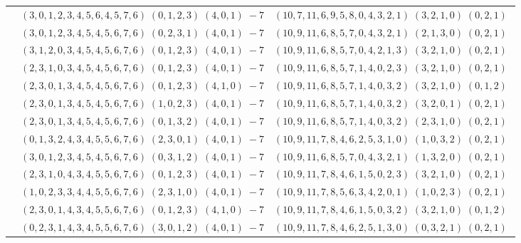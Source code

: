 \documentclass[11pt]{article}
\begin{document}
\begin{longtable}[l]{|c|c|c|}
 \cline{2-3} 
 & $(3 ,0 ,1 ,2 ,3 ,4 ,5 ,6 ,4 ,5 ,7 ,6) \;(0 ,1 ,2 ,3) \;(4 ,0 ,1) \;-7$ & $(10 ,7 ,11 ,6 ,9 ,5 ,8 ,0 ,4 ,3 ,2 ,1) \;(3 ,2 ,1 ,0) \;(0 ,2 ,1) \;$\\ 
 \cline{2-3} 
 & $(3 ,0 ,1 ,2 ,3 ,4 ,5 ,4 ,5 ,6 ,7 ,6) \;(0 ,2 ,3 ,1) \;(4 ,0 ,1) \;-7$ & $(10 ,9 ,11 ,6 ,8 ,5 ,7 ,0 ,4 ,3 ,2 ,1) \;(2 ,1 ,3 ,0) \;(0 ,2 ,1) \;$\\ 
 \cline{2-3} 
 & $(3 ,1 ,2 ,0 ,3 ,4 ,5 ,4 ,5 ,6 ,7 ,6) \;(0 ,1 ,2 ,3) \;(4 ,0 ,1) \;-7$ & $(10 ,9 ,11 ,6 ,8 ,5 ,7 ,0 ,4 ,2 ,1 ,3) \;(3 ,2 ,1 ,0) \;(0 ,2 ,1) \;$\\ 
 \cline{2-3} 
 & $(2 ,3 ,1 ,0 ,3 ,4 ,5 ,4 ,5 ,6 ,7 ,6) \;(0 ,1 ,2 ,3) \;(4 ,0 ,1) \;-7$ & $(10 ,9 ,11 ,6 ,8 ,5 ,7 ,1 ,4 ,0 ,2 ,3) \;(3 ,2 ,1 ,0) \;(0 ,2 ,1) \;$\\ 
 \cline{2-3} 
 & $(2 ,3 ,0 ,1 ,3 ,4 ,5 ,4 ,5 ,6 ,7 ,6) \;(0 ,1 ,2 ,3) \;(4 ,1 ,0) \;-7$ & $(10 ,9 ,11 ,6 ,8 ,5 ,7 ,1 ,4 ,0 ,3 ,2) \;(3 ,2 ,1 ,0) \;(0 ,1 ,2) \;$\\ 
 \cline{2-3} 
 & $(2 ,3 ,0 ,1 ,3 ,4 ,5 ,4 ,5 ,6 ,7 ,6) \;(1 ,0 ,2 ,3) \;(4 ,0 ,1) \;-7$ & $(10 ,9 ,11 ,6 ,8 ,5 ,7 ,1 ,4 ,0 ,3 ,2) \;(3 ,2 ,0 ,1) \;(0 ,2 ,1) \;$\\ 
 \cline{2-3} 
 & $(2 ,3 ,0 ,1 ,3 ,4 ,5 ,4 ,5 ,6 ,7 ,6) \;(0 ,1 ,3 ,2) \;(4 ,0 ,1) \;-7$ & $(10 ,9 ,11 ,6 ,8 ,5 ,7 ,1 ,4 ,0 ,3 ,2) \;(2 ,3 ,1 ,0) \;(0 ,2 ,1) \;$\\ 
 \cline{2-3} 
 & $(0 ,1 ,3 ,2 ,4 ,3 ,4 ,5 ,5 ,6 ,7 ,6) \;(2 ,3 ,0 ,1) \;(4 ,0 ,1) \;-7$ & $(10 ,9 ,11 ,7 ,8 ,4 ,6 ,2 ,5 ,3 ,1 ,0) \;(1 ,0 ,3 ,2) \;(0 ,2 ,1) \;$\\ 
 \cline{2-3} 
 & $(3 ,0 ,1 ,2 ,3 ,4 ,5 ,4 ,5 ,6 ,7 ,6) \;(0 ,3 ,1 ,2) \;(4 ,0 ,1) \;-7$ & $(10 ,9 ,11 ,6 ,8 ,5 ,7 ,0 ,4 ,3 ,2 ,1) \;(1 ,3 ,2 ,0) \;(0 ,2 ,1) \;$\\ 
 \cline{2-3} 
 & $(2 ,3 ,1 ,0 ,4 ,3 ,4 ,5 ,5 ,6 ,7 ,6) \;(0 ,1 ,2 ,3) \;(4 ,0 ,1) \;-7$ & $(10 ,9 ,11 ,7 ,8 ,4 ,6 ,1 ,5 ,0 ,2 ,3) \;(3 ,2 ,1 ,0) \;(0 ,2 ,1) \;$\\ 
 \cline{2-3} 
 & $(1 ,0 ,2 ,3 ,3 ,4 ,4 ,5 ,5 ,6 ,7 ,6) \;(2 ,3 ,1 ,0) \;(4 ,0 ,1) \;-7$ & $(10 ,9 ,11 ,7 ,8 ,5 ,6 ,3 ,4 ,2 ,0 ,1) \;(1 ,0 ,2 ,3) \;(0 ,2 ,1) \;$\\ 
 \cline{2-3} 
 & $(2 ,3 ,0 ,1 ,4 ,3 ,4 ,5 ,5 ,6 ,7 ,6) \;(0 ,1 ,2 ,3) \;(4 ,1 ,0) \;-7$ & $(10 ,9 ,11 ,7 ,8 ,4 ,6 ,1 ,5 ,0 ,3 ,2) \;(3 ,2 ,1 ,0) \;(0 ,1 ,2) \;$\\ 
 \cline{2-3} 
 & $(0 ,2 ,3 ,1 ,4 ,3 ,4 ,5 ,5 ,6 ,7 ,6) \;(3 ,0 ,1 ,2) \;(4 ,0 ,1) \;-7$ & $(10 ,9 ,11 ,7 ,8 ,4 ,6 ,2 ,5 ,1 ,3 ,0) \;(0 ,3 ,2 ,1) \;(0 ,2 ,1) \;$\\ 

\end{longtable}
\end{document}
